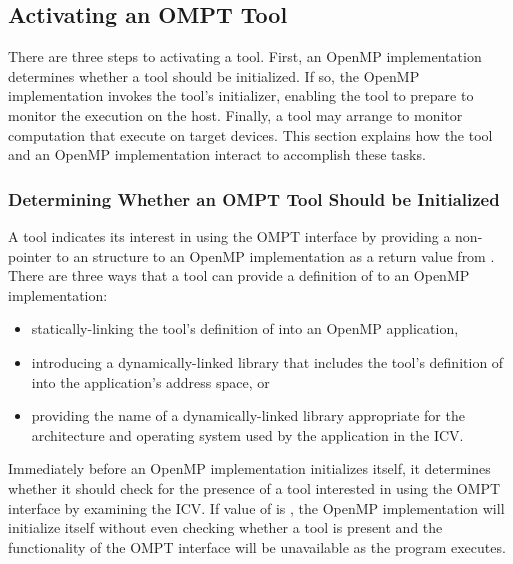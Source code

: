 \subsection{Activating an OMPT Tool}
\label{sec:ompt-initialization}

There are three steps to activating a tool. First, an OpenMP
implementation determines whether a tool should be initialized.  If
so, the OpenMP implementation invokes the tool's initializer, enabling
the tool to prepare to monitor the execution on the host. Finally, a
tool may arrange to monitor computation that execute
on target devices. This section explains how the tool and an
OpenMP implementation interact to accomplish these tasks.

\subsubsection{Determining Whether an OMPT Tool Should be Initialized}
\label{sec:ompt-check-tool}

A tool indicates its interest in using the OMPT interface
by providing a non- pointer to an
structure to an OpenMP implementation as a return value from
. There are three ways
that a tool can provide a definition of  to an
OpenMP implementation:

\begin{itemize}
\item statically-linking the tool's definition of 
  into an OpenMP application,
\item introducing a dynamically-linked library that includes the tool's definition
  of  into the application's address space, or
\item providing the name of a dynamically-linked library appropriate
  for the architecture and operating system used by the application
  in the  ICV.
\end{itemize}

Immediately before an OpenMP implementation initializes itself, it
determines whether it should check for the presence of a tool
interested in using the OMPT interface by examining the 
ICV.  If value of  is , the OpenMP
implementation will initialize itself without even checking whether a
tool is present and the functionality of the OMPT interface will be
unavailable as the program executes.

